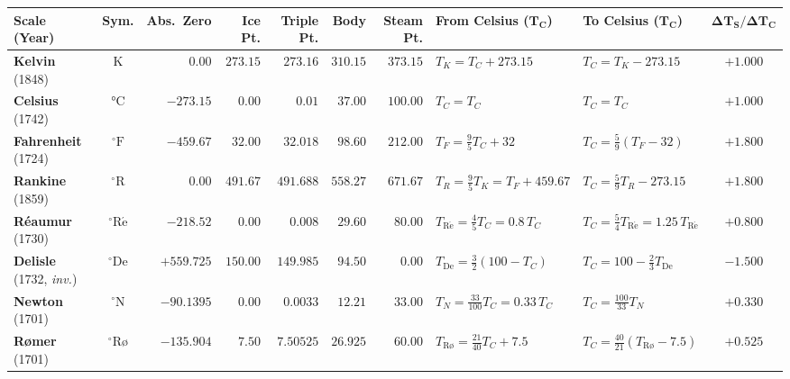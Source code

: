 \begin{center}
\label{tab:03:scales}
\footnotesize\setlength{\tabcolsep}{3.2pt}\renewcommand{\arraystretch}{1.15}
\begin{tabularx}{\linewidth}{@{}l c r r r r r l l c@{}}\toprule
\textbf{Scale (Year)} & \textbf{Sym.} & \textbf{Abs.\ Zero} & \textbf{Ice Pt.} & \textbf{Triple Pt.} & \textbf{Body} & \textbf{Steam Pt.} & \textbf{From Celsius ($\boldsymbol{T_C}$)} & \textbf{To Celsius ($\boldsymbol{T_C}$)} & $\boldsymbol{\Delta T_S/\Delta T_C}$ \\\midrule
\textbf{Kelvin} (1848) & $\si{\kelvin}$ & $0.00$ & $273.15$ & $273.16$ & $310.15$ & $373.15$ & $T_K = T_C + 273.15$ & $T_C = T_K - 273.15$ & $+1.000$ \\
\textbf{Celsius} (1742) & $\si{\celsius}$ & $-273.15$ & $0.00$ & $0.01$ & $37.00$ & $100.00$ & $T_C = T_C$ & $T_C = T_C$ & $+1.000$ \\
\textbf{Fahrenheit} (1724) & $^\circ\mathrm{F}$ & $-459.67$ & $32.00$ & $32.018$ & $98.60$ & $212.00$ & $T_F = \tfrac{9}{5}T_C + 32$ & $T_C = \tfrac{5}{9}(T_F - 32)$ & $+1.800$ \\
\textbf{Rankine} (1859) & $^\circ\mathrm{R}$ & $0.00$ & $491.67$ & $491.688$ & $558.27$ & $671.67$ & $T_R = \tfrac{9}{5}T_K = T_F + 459.67$ & $T_C = \tfrac{5}{9}T_R - 273.15$ & $+1.800$ \\
\textbf{R\'eaumur} (1730) & $^\circ\mathrm{R\acute{e}}$ & $-218.52$ & $0.00$ & $0.008$ & $29.60$ & $80.00$ & $T_{\mathrm{R\acute{e}}} = \tfrac{4}{5}T_C = 0.8\,T_C$ & $T_C = \tfrac{5}{4}T_{\mathrm{R\acute{e}}} = 1.25\,T_{\mathrm{R\acute{e}}}$ & $+0.800$ \\
\textbf{Delisle} (1732, \emph{inv.}) & $^\circ\mathrm{De}$ & $+559.725$ & $150.00$ & $149.985$ & $94.50$ & $0.00$ & $T_{\mathrm{De}} = \tfrac{3}{2}(100 - T_C)$ & $T_C = 100 - \tfrac{2}{3}T_{\mathrm{De}}$ & $\mathbf{-1.500}$ \\
\textbf{Newton} (1701) & $^\circ\mathrm{N}$ & $-90.1395$ & $0.00$ & $0.0033$ & $12.21$ & $33.00$ & $T_N = \tfrac{33}{100}T_C = 0.33\,T_C$ & $T_C = \tfrac{100}{33}T_N$ & $+0.330$ \\
\textbf{R\o mer} (1701) & $^\circ\text{R\o}$ & $-135.904$ & $7.50$ & $7.50525$ & $26.925$ & $60.00$ & $T_{\text{R\o}} = \tfrac{21}{40}T_C + 7.5$ & $T_C = \tfrac{40}{21}(T_{\text{R\o}} - 7.5)$ & $+0.525$ \\\bottomrule
\end{tabularx}
\end{center}

